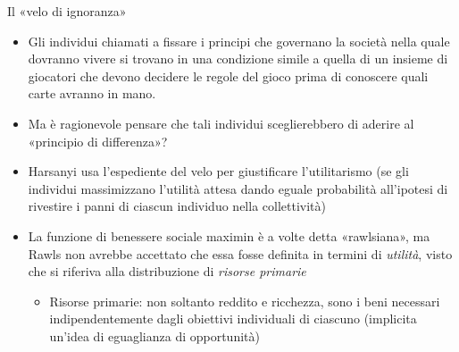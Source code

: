 \documentclass[aspectratio=64,12pt]{beamer}
\begin{document}
\begin{frame}{Il «velo di ignoranza»}
\begin{itemize}
\item Gli individui chiamati a fissare i principi che governano la società nella
quale dovranno vivere si trovano in una condizione simile a quella di un
insieme di giocatori che devono decidere le regole del gioco prima di
conoscere quali carte avranno in mano.
\item Ma è ragionevole pensare che tali individui sceglierebbero di aderire al
«principio di differenza»?
\item Harsanyi usa l'espediente del velo per giustificare l'utilitarismo (se gli
individui massimizzano l'utilità attesa dando eguale probabilità all'ipotesi
di rivestire i panni di ciascun individuo nella collettività)

\item La funzione di benessere sociale maximin è a volte detta «rawlsiana», ma
Rawls non avrebbe accettato che essa fosse definita in termini di \emph{utilità},
visto che si riferiva alla distribuzione di \emph{risorse primarie}
\begin{itemize}
\item Risorse primarie: non soltanto reddito e ricchezza, sono i beni necessari
indipendentemente dagli obiettivi individuali di ciascuno (implicita
un'idea di eguaglianza di opportunità)
\end{itemize}
\end{itemize}
\end{frame}
\end{document}
